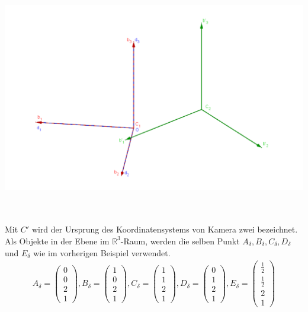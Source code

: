 \begin{minipage}{\linewidth}
	\centering
	\includegraphics[width=1.\linewidth]{images/GrafikHomographieDifferentC.png}
\end{minipage}\\ \\

Mit $C'$ wird der Ursprung des Koordinatensystems von Kamera zwei bezeichnet. Als Objekte in der Ebene im $\mathbb{R}^3$-Raum, werden die selben Punkt $A_\delta,B_\delta,C_\delta,D_\delta$ und $E_\delta$ wie im vorherigen Beispiel verwendet.\\

\begin{gather}
	A_\delta=\begin{pmatrix}
		0\\0\\2\\1
	\end{pmatrix}, 
	B_\delta=
	\begin{pmatrix}
		1\\0\\2\\1
	\end{pmatrix},
	C_\delta=
	\begin{pmatrix}
		1\\1\\2\\1
	\end{pmatrix},
	D_\delta=
	\begin{pmatrix}
		0\\1\\2\\1
	\end{pmatrix},
	E_\delta=
	\begin{pmatrix}
		\frac{1}{2}\\\frac{1}{2}\\2\\1
	\end{pmatrix}
\end{gather}\\

